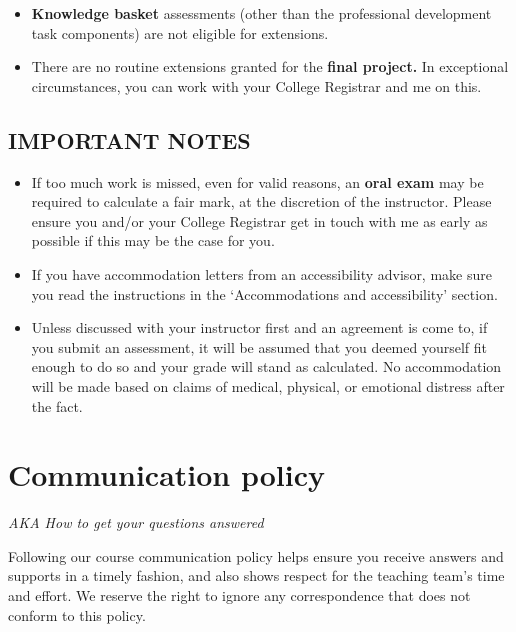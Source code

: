\documentclass[
  openany]{book}
\begin{document}
\begin{itemize}
\item
  \textbf{Knowledge basket} assessments (other than the professional development task components) are not eligible for extensions.
\item
  There are no routine extensions granted for the \textbf{final project.} In exceptional circumstances, you can work with your College Registrar and me on this.
\end{itemize}

\hypertarget{important-notes}{%
\subsection{IMPORTANT NOTES}\label{important-notes}}

\begin{itemize}
\item
  If too much work is missed, even for valid reasons, an \textbf{oral exam} may be required to calculate a fair mark, at the discretion of the instructor. Please ensure you and/or your College Registrar get in touch with me as early as possible if this may be the case for you.
\item
  If you have accommodation letters from an accessibility advisor, make sure you read the instructions in the `Accommodations and accessibility' section.
\item
  Unless discussed with your instructor first and an agreement is come to, if you submit an assessment, it will be assumed that you deemed yourself fit enough to do so and your grade will stand as calculated. No accommodation will be made based on claims of medical, physical, or emotional distress after the fact.
\end{itemize}

\hypertarget{communication-policy}{%
\section{Communication policy}\label{communication-policy}}

\emph{AKA How to get your questions answered}

Following our course communication policy helps ensure you receive answers and supports in a timely fashion, and also shows respect for the teaching team's time and effort. We reserve the right to ignore any correspondence that does not conform to this policy.
\end{document}

